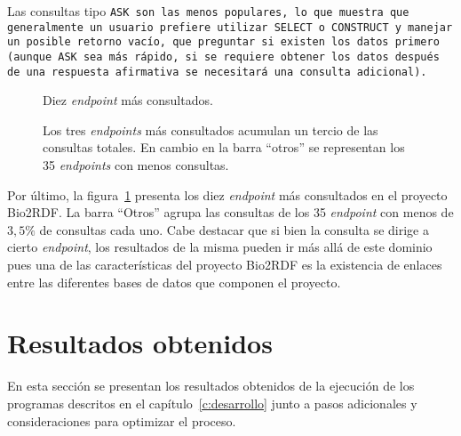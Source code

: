 Las consultas tipo \tt{ASK} son las menos populares, lo que muestra que
generalmente un usuario prefiere utilizar \tt{SELECT} o \tt{CONSTRUCT} y manejar
un posible retorno vacío, que preguntar si existen los datos primero (aunque
\tt{ASK} sea más rápido, si se requiere obtener los datos después de una
respuesta afirmativa se necesitará una consulta adicional).

\begin{figure}[h!]
  \caption{Diez \emph{endpoint} más consultados.}\label{fig:t10endp}
  \vspace{-.2cm}
  \caption*{\small
    Los tres \emph{endpoints} más consultados acumulan un tercio de las
    consultas totales. En cambio en la barra ``otros'' se representan los 35 
    \emph{endpoints} con menos consultas.
  }
\end{figure}

Por último, la figura~\ref{fig:t10endp} presenta los diez \emph{endpoint} más
consultados en el proyecto Bio2RDF. La barra ``Otros'' agrupa las consultas de
los 35 \emph{endpoint} con menos de $3,5\%$ de consultas cada uno. Cabe destacar
que si bien la consulta se dirige a cierto \emph{endpoint}, los resultados de la
misma pueden ir más allá de este dominio pues una de las características del
proyecto Bio2RDF es la existencia de enlaces entre las diferentes bases de datos
que componen el proyecto.

\section{Resultados obtenidos}\label{sec:res}
En esta sección se presentan los resultados obtenidos de la ejecución de los
programas descritos en el capítulo~\ref{c:desarrollo} junto a pasos 
adicionales y consideraciones para optimizar el proceso.

